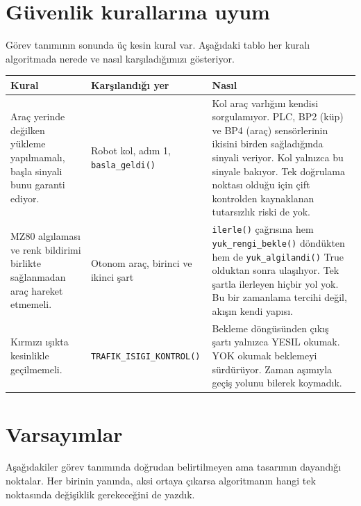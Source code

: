 \documentclass[11pt,a4paper]{article}
\newcommand{\ey}[1]{\texttt{#1}}
\begin{document}
\clearpage

\section{Güvenlik kurallarına uyum}

Görev tanımının sonunda üç kesin kural var. Aşağıdaki tablo her kuralı
algoritmada nerede ve nasıl karşıladığımızı gösteriyor.

\begin{longtable}{@{}p{4.3cm}p{3.2cm}p{7.2cm}@{}}
\toprule
\textbf{Kural} & \textbf{Karşılandığı yer} & \textbf{Nasıl} \\
\midrule
\endhead
Araç yerinde değilken yükleme yapılmamalı, başla sinyali bunu garanti ediyor. &
Robot kol, adım 1, \ey{basla\_geldi()} &
Kol araç varlığını kendisi sorgulamıyor. PLC, BP2 (küp) ve BP4 (araç)
sensörlerinin ikisini birden sağladığında sinyali veriyor. Kol yalnızca bu
sinyale bakıyor. Tek doğrulama noktası olduğu için çift kontrolden kaynaklanan
tutarsızlık riski de yok. \\
\addlinespace
MZ80 algılaması ve renk bildirimi birlikte sağlanmadan araç hareket etmemeli. &
Otonom araç, birinci ve ikinci şart &
\ey{ilerle()} çağrısına hem \ey{yuk\_rengi\_bekle()} döndükten hem de
\ey{yuk\_algilandi()} True olduktan sonra ulaşılıyor. Tek şartla ilerleyen
hiçbir yol yok. Bu bir zamanlama tercihi değil, akışın kendi yapısı. \\
\addlinespace
Kırmızı ışıkta kesinlikle geçilmemeli. &
\ey{TRAFIK\_ISIGI\_KONTROL()} &
Bekleme döngüsünden çıkış şartı yalnızca YESIL okumak. YOK okumak beklemeyi
sürdürüyor. Zaman aşımıyla geçiş yolunu bilerek koymadık. \\
\bottomrule
\end{longtable}

\section{Varsayımlar}

Aşağıdakiler görev tanımında doğrudan belirtilmeyen ama tasarımın dayandığı
noktalar. Her birinin yanında, aksi ortaya çıkarsa algoritmanın hangi tek
noktasında değişiklik gerekeceğini de yazdık.
\end{document}
